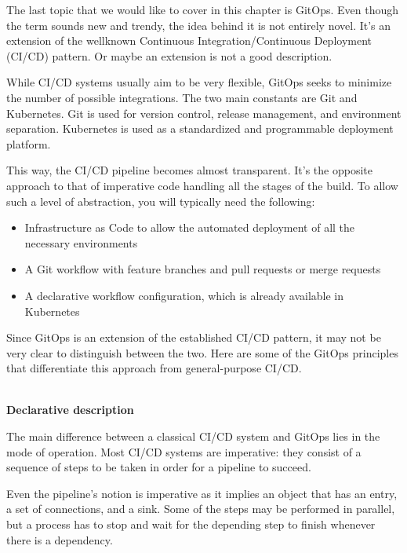
The last topic that we would like to cover in this chapter is GitOps. Even though the term sounds new and trendy, the idea behind it is not entirely novel. It's an extension of the wellknown Continuous Integration/Continuous Deployment (CI/CD) pattern. Or maybe an extension is not a good description.

While CI/CD systems usually aim to be very flexible, GitOps seeks to minimize the number of possible integrations. The two main constants are Git and Kubernetes. Git is used for version control, release management, and environment separation. Kubernetes is used as a standardized and programmable deployment platform.

This way, the CI/CD pipeline becomes almost transparent. It's the opposite approach to that of imperative code handling all the stages of the build. To allow such a level of abstraction, you will typically need the following:

\begin{itemize}
\item 
Infrastructure as Code to allow the automated deployment of all the necessary environments

\item 
A Git workflow with feature branches and pull requests or merge requests

\item 
A declarative workflow configuration, which is already available in Kubernetes
\end{itemize}


Since GitOps is an extension of the established CI/CD pattern, it may not be very clear to distinguish between the two. Here are some of the GitOps principles that differentiate this approach from general-purpose CI/CD.

\hspace*{\fill} \\ %
\noindent
\textbf{Declarative description}

The main difference between a classical CI/CD system and GitOps lies in the mode of operation. Most CI/CD systems are imperative: they consist of a sequence of steps to be taken in order for a pipeline to succeed.

Even the pipeline's notion is imperative as it implies an object that has an entry, a set of connections, and a sink. Some of the steps may be performed in parallel, but a process has to stop and wait for the depending step to finish whenever there is a dependency.

